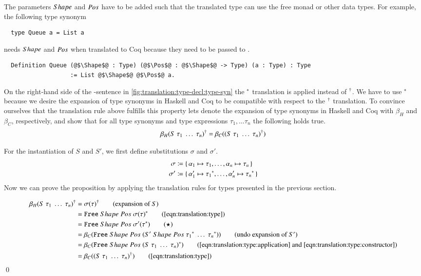 The parameters $Shape$ and $Pos$ have to be added such that the translated type can use the free monad or other data types.
For example, the following type synonym
\begin{verbatim}
  type Queue a = List a
\end{verbatim}
needs $Shape$ and $Pos$ when translated to Coq because they need to be passed to .
\begin{verbatim}
  Definition Queue (@$\Shape$@ : Type) (@$\Pos$@ : @$\Shape$@ -> Type) (a : Type) : Type
                   := List @$\Shape$@ @$\Pos$@ a.
\end{verbatim}

On the right-hand side of the -sentence in \autoref{fig:translation:type-decl:type-syn} the ${}^{*}$ translation is applied instead of ${}^{\dagger}$.
We have to use ${}^{*}$ because we desire the expansion of type synonyms in Haskell and Coq to be compatible with respect to the ${}^{\dagger}$ translation.
To convince ourselves that the translation rule above fulfills this property lets denote the expansion of type synonyms in Haskell and Coq with $\beta_H$ and $\beta_C$, respectively, and show that for all type synonyms  and type expressions $\tau_1, \ldots \tau_n$ the following holds true.
\[
  {\beta_H(S\;\tau_1\;\ldots\;\tau_n)}^{\dagger}
  = \beta_C({(S\;\tau_1\;\ldots\;\tau_n)}^{\dagger})
\]

For the instantiation of $S$ and $S'$, we first define substitutions $\sigma$ and $\sigma'$.
\begin{align*}
  \sigma &\coloneqq \{\, \alpha_1 \mapsto \tau_1, \ldots, \alpha_n \mapsto \tau_n \,\} \\
  \sigma' &\coloneqq \{\, \alpha_1' \mapsto {\tau_1}^{*}, \ldots, \alpha_n' \mapsto {\tau_n}^{*} \,\}
\end{align*}
Now we can prove the proposition by applying the translation rules for types presented in the previous section.

\begin{align*}
  \toCoq{\beta_H(S\;\tau_1\;\ldots\;\tau_n)}
    &= \toCoq{\sigma(\tau)}
       \tag{expansion of $S$} \\
    &= \Free{\toCoqT{\sigma(\tau)}}
       \tag{\autoref{eqn:translation:type}} \\
    &= \Free{\sigma'(\toCoqT{\tau})}
       \tag{$\star$} \\
    &= \beta_C{(\Free{(\genApply{S'}\;\toCoqT{\tau_1}\;\ldots\;\toCoqT{\tau_n})})}
       \tag{undo expansion of $S'$} \\
    &= \beta_C{(\Free{\toCoqT{(S\;\tau_1\;\ldots\;\tau_n)}})}
       \tag{\autoref{eqn:translation:type:application} and \ref{eqn:translation:type:constructor}} \\
    &= \beta_C(\toCoq{(S\;\tau_1\;\ldots\;\tau_n)})
       \tag{\autoref{eqn:translation:type}}
\end{align*}
\qed

